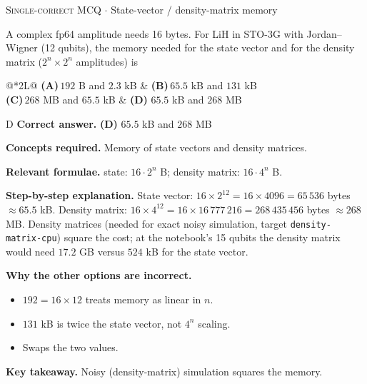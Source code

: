 \documentclass[11pt,a4paper]{article}
\newcommand{\optlabel}[1]{\textbf{(#1)}}
\newcommand{\correctlabel}[1]{\textcolor{okgreen}{\textbf{(#1)}\,\ding{51}}}
\newenvironment{qitem}[1]{\begin{list}{}{\setlength{\leftmargin}{3.3em}\setlength{\labelwidth}{3.1em}%
  \setlength{\labelsep}{0.2em}\setlength{\topsep}{3pt}\setlength{\parsep}{3pt}}\item[\textbf{Q.#1}\hfill]}{\end{list}}
\newcommand{\qsep}{\par\vspace{2pt}{\color{black!15}\hrule}\vspace{4pt}}
\newcommand{\qmeta}[2]{{\footnotesize\color{black!60}\textsc{#1} \;$\cdot$\; #2}\par}
\begin{document}
\begin{qitem}{33}
\qmeta{Single-correct MCQ}{State-vector / density-matrix memory}
A complex fp64 amplitude needs 16 bytes. For LiH in STO-3G with Jordan--Wigner (12 qubits), the memory needed for the state vector and
for the density matrix ($2^n\times2^n$ amplitudes) is
\par\smallskip\noindent\begin{tabularx}{\linewidth}{@{}*{2}{L}@{}}
\optlabel{A}\,$192$ B and $2.3$ kB & \optlabel{B}\,$65.5$ kB and $131$ kB \\[3pt]
\optlabel{C}\,$268$ MB and $65.5$ kB & \correctlabel{D}\,$65.5$ kB and $268$ MB
\end{tabularx}
\end{qitem}
\begin{solbox}{D}
\textbf{\color{brand}Correct answer.} \textcolor{okgreen}{\textbf{(D)}} $65.5$ kB and $268$ MB

\textbf{\color{brand}Concepts required.} Memory of state vectors and density matrices.

\textbf{\color{brand}Relevant formulae.} state: $16\cdot2^n$ B; density matrix: $16\cdot4^n$ B.

\textbf{\color{brand}Step-by-step explanation.} State vector: $16\times2^{12} = 16\times4096 = 65\,536$ bytes $\approx 65.5$ kB. Density matrix: $16\times4^{12} = 16\times16\,777\,216 = 268\,435\,456$ bytes
$\approx 268$ MB. Density matrices (needed for exact noisy simulation, target \texttt{density-matrix-cpu}) square the cost; at the notebook's 15
qubits the density matrix would need $17.2$ GB versus $524$ kB for the state vector.

\textbf{\color{brand}Why the other options are incorrect.}
\begin{itemize}[leftmargin=2.4em, itemsep=1pt, topsep=2pt]
\item[\textbf{(A)}] $192 = 16\times12$ treats memory as linear in $n$.
\item[\textbf{(B)}] $131$ kB is twice the state vector, not $4^n$ scaling.
\item[\textbf{(C)}] Swaps the two values.
\end{itemize}
\textbf{\color{brand}Key takeaway.} Noisy (density-matrix) simulation squares the memory.
\end{solbox}
\qsep
\end{document}
